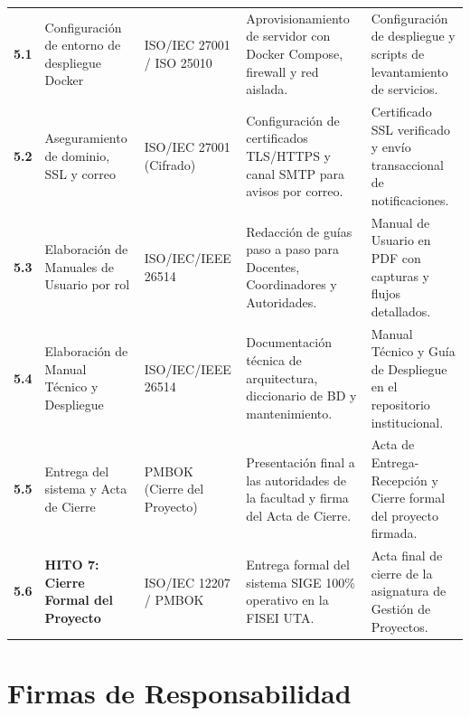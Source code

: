 \documentclass[12pt,a4paper]{article}
\begin{document}
\begin{longtable}{|>{\centering\arraybackslash}m{1.4cm}|>{\raggedright\arraybackslash}m{3.2cm}|>{\raggedright\arraybackslash}m{2.6cm}|>{\raggedright\arraybackslash}m{4.6cm}|>{\raggedright\arraybackslash}m{3.4cm}|}
\multicolumn{5}{|l|}{\cellcolor{lightgraybg}\textbf{FASE 5: DESPLIEGUE, DOCUMENTACIÓN Y CIERRE}} \\ \hline
\textbf{5.1} & Configuración de entorno de despliegue Docker & ISO/IEC 27001 / ISO 25010 & Aprovisionamiento de servidor con Docker Compose, firewall y red aislada. & Configuración de despliegue y scripts de levantamiento de servicios. \\ \hline
\textbf{5.2} & Aseguramiento de dominio, SSL y correo & ISO/IEC 27001 (Cifrado) & Configuración de certificados TLS/HTTPS y canal SMTP para avisos por correo. & Certificado SSL verificado y envío transaccional de notificaciones. \\ \hline
\textbf{5.3} & Elaboración de Manuales de Usuario por rol & ISO/IEC/IEEE 26514 & Redacción de guías paso a paso para Docentes, Coordinadores y Autoridades. & Manual de Usuario en PDF con capturas y flujos detallados. \\ \hline
\textbf{5.4} & Elaboración de Manual Técnico y Despliegue & ISO/IEC/IEEE 26514 & Documentación técnica de arquitectura, diccionario de BD y mantenimiento. & Manual Técnico y Guía de Despliegue en el repositorio institucional. \\ \hline
\textbf{5.5} & Entrega del sistema y Acta de Cierre & PMBOK (Cierre del Proyecto) & Presentación final a las autoridades de la facultad y firma del Acta de Cierre. & Acta de Entrega-Recepción y Cierre formal del proyecto firmada. \\ \hline
\textbf{5.6} & \textbf{HITO 7: Cierre Formal del Proyecto} & ISO/IEC 12207 / PMBOK & Entrega formal del sistema SIGE 100\% operativo en la FISEI UTA. & Acta final de cierre de la asignatura de Gestión de Proyectos. \\ \hline
\end{longtable}

\section{Firmas de Responsabilidad}
\end{document}
